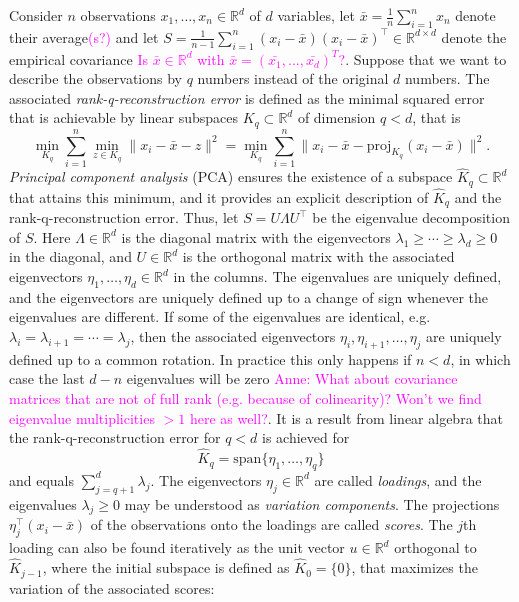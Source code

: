 \documentclass[titlepage,11pt,twoside]{article}
\newcommand{\hl}[1]{\textcolor{magenta}{#1}}
\newcommand{\RR}{\mathbb{R}}
\begin{document}
Consider $n$ observations $x_1,\dotsc,x_n \in \RR^d$ of $d$ variables, let $\bar{x} = \frac{1}{n} \sum_{i=1}^n x_n$ denote their average\hl{(s?)} and let $S = \frac{1}{n-1} \sum_{i=1}^n (x_i-\bar{x}) (x_i-\bar{x})^\top \in \RR^{d \times d}$ denote the empirical covariance \hl{Is $\bar{x} \in \RR^d$ with $\bar{x} = (\bar{x_1}, ..., \bar{x_d})^T$?}. Suppose that we want to describe the observations by $q$ numbers instead of the original $d$ numbers. The associated \emph{rank-q-reconstruction error} is defined as the minimal squared error that is achievable by linear subspaces $K_q \subset \RR^d$ of dimension $q < d$, that is
\begin{equation*}
\min_{K_q} \sum_{i=1}^n \min_{z \in K_q} \lVert x_i - \bar{x} - z \rVert^2 =
\min_{K_q} \sum_{i=1}^n \lVert x_i - \bar{x} - \text{proj}_{K_q}(x_i - \bar{x}) \rVert^2.
\end{equation*}
\emph{Principal component analysis} (PCA) ensures the existence of a subspace $\hat{K}_q \subset \RR^d$ that attains this minimum, and it provides an explicit description of $\hat{K}_q$ and the rank-q-reconstruction error. Thus, let $S = U \Lambda U^\top$ be the eigenvalue decomposition of $S$. Here $\Lambda \in \RR^d$ is the diagonal matrix with the eigenvectors $\lambda_1 \ge \dotsm \ge \lambda_d \ge 0$ in the diagonal, and $U \in \RR^d$ is the orthogonal matrix with the associated eigenvectors $\eta_1,\dotsc,\eta_d \in \RR^d$ in the columns. The eigenvalues are uniquely defined, and the eigenvectors are uniquely defined up to a change of sign whenever the eigenvalues are different. If some of the eigenvalues are identical, e.g.\ $\lambda_i=\lambda_{i+1}=\dotsm=\lambda_j$, then the associated eigenvectors $\eta_i,\eta_{i+1},\dotsc,\eta_j$ are uniquely defined up to a common rotation. In practice this only happens if $n < d$, in which case the last $d-n$ eigenvalues will be zero \hl{Anne: What about covariance matrices that are not of full rank (e.g. because of colinearity)? Won't we find eigenvalue multiplicities $> 1$ here as well?}. It is a result from linear algebra that the rank-q-reconstruction error for $q < d$ is achieved for
\begin{equation*}
\hat{K}_q = \text{span}\{\eta_1,\dotsc,\eta_q\}
\end{equation*}
and equals $\sum_{j=q+1}^d \lambda_j$. The eigenvectors $\eta_j \in \RR^d$ are called \emph{loadings}, and the eigenvalues $\lambda_j \ge 0$ may be understood as \emph{variation components}. The projections $\eta_j^\top (x_i - \bar{x})$ of the observations onto the loadings are called \emph{scores}. The $j$th loading can also be found iteratively as the unit vector $u \in \RR^d$ orthogonal to $\hat{K}_{j-1}$, where the initial subspace is defined as $\hat{K}_0 = \{0\}$, that maximizes the variation of the associated scores:
\end{document}
